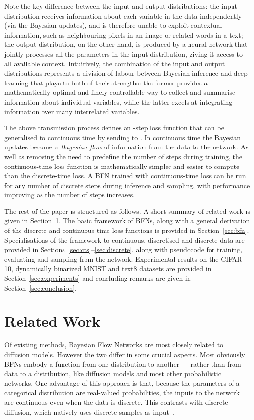 \documentclass[11pt,table]{article}
\newcommand{\0}[1]{\constvec{0}{#1}}
\newcommand{\1}[1]{\constvec{1}{#1}}
\begin{document}
Note the key difference between the input and output distributions: the input distribution receives information about each variable in the data independently (via the Bayesian updates), and is therefore unable to exploit contextual information, such as neighbouring pixels in an image or related words in a text; the output distribution, on the other hand, is produced by a neural network that jointly processes all the parameters in the input distribution, giving it access to all available context.
Intuitively, the combination of the input and output distributions represents a division of labour between Bayesian inference and deep learning that plays to both of their strengths: the former provides a mathematically optimal and finely controllable way to collect and summarise information about individual variables, while the latter excels at integrating information over many interrelated variables.

The above transmission process defines an -step loss function that can be generalised to continuous time by sending  to .
In continuous time the Bayesian updates become a \emph{Bayesian flow} of information from the data to the network.
As well as removing the need to predefine the number of steps during training, the continuous-time loss function is mathematically simpler and easier to compute than the discrete-time loss.
A BFN trained with continuous-time loss can be run for any number of discrete steps during inference and sampling, with performance improving as the number of steps increases.

The rest of the paper is structured as follows. 
A short summary of related work is given in Section~\ref{sec:related}.
The basic framework of BFNs, along with a general derivation of the discrete and continuous time loss functions is provided in Section~\ref{sec:bfn}.
Specialisations of the framework to continuous, discretised and discrete data are provided in Sections~\ref{sec:cts}--\ref{sec:discrete}, along with pseudocode for training, evaluating and sampling from the network.
Experimental results on the CIFAR-10, dynamically binarized MNIST and text8 datasets are provided in Section~\ref{sec:experiments} and concluding remarks are given in Section~\ref{sec:conclusion}.

\section{Related Work}\label{sec:related}
Of existing methods, Bayesian Flow Networks are most closely related to diffusion models.
However the two differ in some crucial aspects.
Most obviously BFNs embody a function from one distribution to another --- rather than from data to a distribution, like diffusion models and most other probabilistic networks. 
One advantage of this approach is that, because the parameters of a categorical distribution are real-valued probabilities, the inputs to the network are continuous even when the data is discrete. 
This contrasts with discrete diffusion, which natively uses discrete samples as input~\citep{sohl2015deep,hoogeboom2021,austin2021d3pm}.
\end{document}
